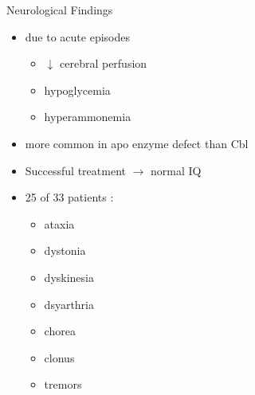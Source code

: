 \documentclass[presentation, smaller]{beamer}
\begin{document}
\begin{frame}[label={sec:orgheadline22}]{Neurological Findings}
\begin{itemize}
\item due to acute episodes
\begin{itemize}
\item \(\downarrow\) cerebral perfusion
\item hypoglycemia
\item hyperammonemia
\end{itemize}
\item more common in apo enzyme defect than Cbl
\item Successful treatment \(\to\) normal IQ
\item 25 of 33 patients :
\begin{itemize}
\item ataxia
\item dystonia
\item dyskinesia
\item dsyarthria
\item chorea
\item clonus
\item tremors
\end{itemize}
\end{itemize}
\end{frame}
\end{document}
